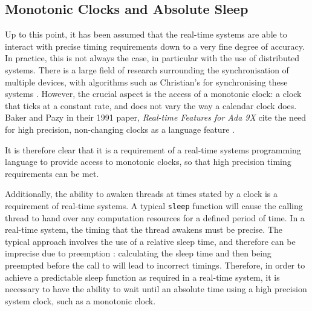 \subsection{Monotonic Clocks and Absolute Sleep}
Up to this point, it has been assumed that the real-time systems are able to 
interact with precise timing requirements down to a very fine degree of accuracy.
In practice, this is not always the case, in particular with the use of 
distributed systems. There is a large field of research surrounding the 
synchronisation of multiple devices, with algorithms such as Christian's for 
synchronising these systems \cite{37958}. However, the crucial aspect is the 
access of a monotonic clock: a clock that ticks at a constant rate, and does not 
vary the way a calendar clock does. Baker and Pazy in their 1991 paper, \emph{
Real-time Features for Ada 9X} cite the need for high precision, non-changing 
clocks as a language feature \cite{160371}. 
\par\bigskip\noindent
It is therefore clear that it is a requirement of a real-time systems programming 
language to provide access to monotonic clocks, so that high precision timing 
requirements can be met. 
\par\bigskip\noindent
Additionally, the ability to awaken threads at times stated by a clock is a 
requirement of real-time systems. A typical \texttt{sleep} function will cause 
the calling thread to hand over any computation resources for a defined period of time. 
In a real-time system, the timing that the thread awakens must be precise. 
The typical approach involves the use of a relative sleep time, and therefore can 
be imprecise due to preemption \cite{real-time-systems}: calculating the sleep time
and then being preempted before the call to  will lead to incorrect 
timings. Therefore, in order to achieve a predictable 
sleep function as required in a real-time system, it is necessary 
to have the ability to wait until an absolute time using a high precision 
system clock, such as a monotonic clock.

